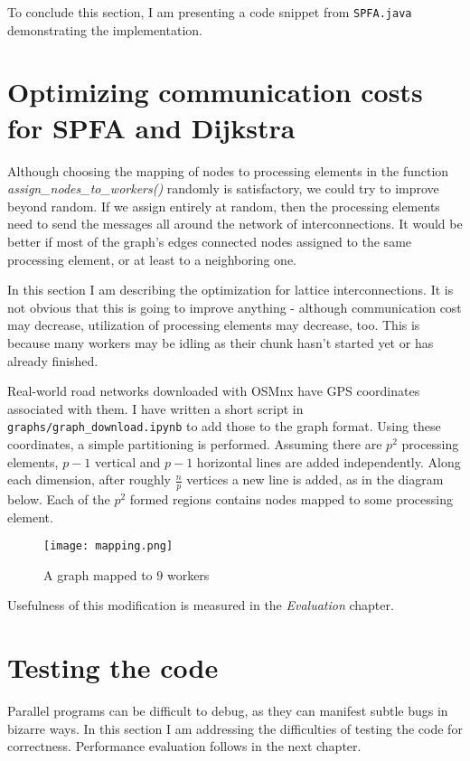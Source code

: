 \documentclass[12pt,a4paper,twoside,openright]{report}
\begin{document}
To conclude this section, I am presenting a code snippet from \texttt{SPFA.java} demonstrating the implementation.


\section{Optimizing communication costs for SPFA and Dijkstra}
Although choosing the mapping of nodes to processing elements in the function \textit{assign\_nodes\_to\_workers()} randomly is satisfactory, we could try to improve beyond random. If we assign entirely at random, then the processing elements need to send the messages all around the network of interconnections. It would be better if most of the graph's edges connected nodes assigned to the same processing element, or at least to a neighboring one.

In this section I am describing the optimization for lattice interconnections. It is not obvious that this is going to improve anything - although communication cost may decrease, utilization of processing elements may decrease, too. This is because many workers may be idling as their chunk hasn't started yet or has already finished. 

Real-world road networks downloaded with OSMnx have GPS coordinates associated with them. I have written a short script in \texttt{graphs/graph\_download.ipynb} to add those to the graph format. Using these coordinates, a simple partitioning is performed. Assuming there are $p^2$ processing elements, $p-1$ vertical and $p-1$ horizontal lines are added independently. Along each dimension, after roughly $\frac{n}{p}$ vertices a new line is added, as in the diagram below. Each of the $p^2$ formed regions contains nodes mapped to some processing element.

\begin{figure}[ht]
\centering
\texttt{[image: mapping.png]}
\caption{A graph mapped to $9$ workers}
\end{figure}

Usefulness of this modification is measured in the \textit{Evaluation} chapter.

\section{Testing the code}
Parallel programs can be difficult to debug, as they can manifest subtle bugs in bizarre ways. In this section I am addressing the difficulties of testing the code for correctness. Performance evaluation follows in the next chapter.
\end{document}
